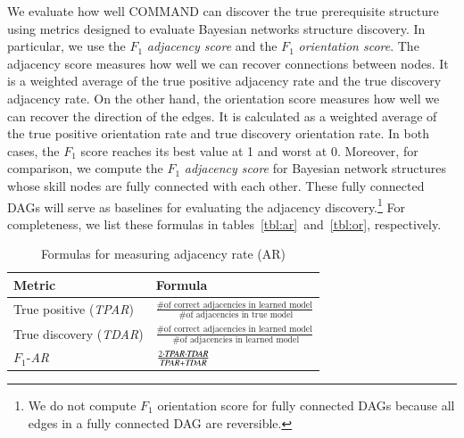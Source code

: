 \documentclass{edm_template}
\begin{document}
	
	We evaluate how well COMMAND can discover the true prerequisite structure using metrics designed to evaluate Bayesian networks structure discovery.
	In particular, we use the $F_1$ \emph{adjacency score} and the $F_1$ \emph{orientation score}.
	The adjacency score measures how well we can recover connections between nodes.
	It is a weighted average of the true positive adjacency rate and the true discovery adjacency rate.
	On the other hand, the orientation score measures how well we can recover the direction of the edges.
	It is calculated as a weighted average of the true positive orientation rate and true discovery orientation rate.
	In both cases, the $F_1$ score reaches its best value at 1 and worst at 0. 
	Moreover, for comparison, we compute the $F_1$ \emph{adjacency score} for Bayesian network structures whose skill nodes are fully connected with each other. 
	These fully connected DAGs will serve as baselines for evaluating the adjacency discovery.\footnote{We do not compute $F_1$ orientation score for fully connected DAGs because all edges in a fully connected DAG are reversible.}
	For completeness, we list these formulas in tables~\ref{tbl:ar}~and~\ref{tbl:or}, respectively.
	
	
	\begin{table}[ht]
		\centering
		\caption{Formulas for measuring adjacency rate (AR) \label{tbl:ar}}
		\label{my-label}
		\begin{tabular}{@{}ll@{}}
			\toprule
			Metric & Formula \\ \midrule
			True positive    (\emph{TPAR}) & $\frac{ \text{\# of correct adjacencies in learned model} } { \text{ \# of adjacencies in true model} }$  \\
			True discovery (\emph{TDAR}) &  $\frac{ \text{\# of correct adjacencies in learned model} } { \text{ \# of adjacencies in learned model} }$ \\
			$F_1$-\textit{AR} &  $\frac{2\cdot \text{\emph{TPAR}} \cdot \text{\emph{TDAR}}} {\text{\emph{TPAR}}+\text{\emph{TDAR}}}$  \\
			\bottomrule
		\end{tabular}
	\end{table}
	
\end{document}
